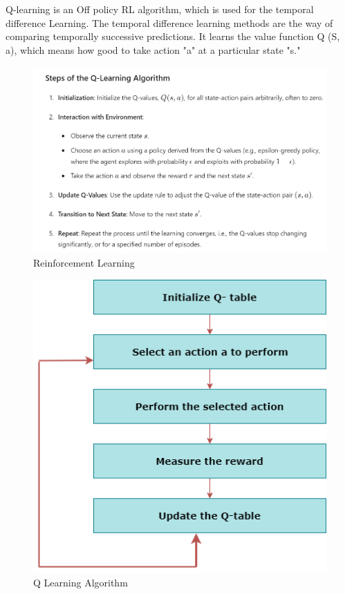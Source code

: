 \documentclass[12pt,a4paper]{report}
\begin{document}
Q-learning is an Off policy RL algorithm, which is used for the temporal difference Learning. The temporal difference learning methods are the way of comparing temporally successive predictions.
It learns the value function Q (S, a), which means how good to take action "a" at a particular state "s."
\begin{figure}[h!]
    \centering
    \includegraphics[width=\textwidth]{RL-1.png}
    \caption{Reinforcement Learning}
    \label{fig:Reinforcement Learning}
\end{figure}
\begin{figure}[htbp]
    \centering
    \includegraphics[width=\textwidth]{reinforcement-learning-algorithms.png}
    \caption{Q Learning Algorithm}
    \label{fig:Q-Learning}
\end{figure}
\newpage
\end{document}
